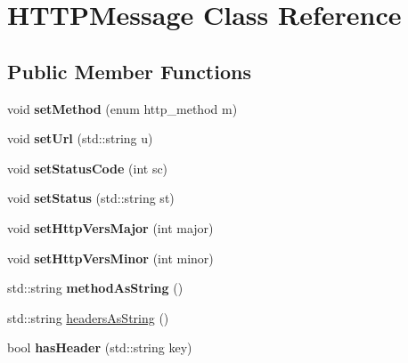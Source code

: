 \hypertarget{class_h_t_t_p_message}{}\section{H\+T\+T\+P\+Message Class Reference}
\label{class_h_t_t_p_message}
\subsection*{Public Member Functions}
\begin{DoxyCompactItemize}
\item 
\mbox{\label{class_h_t_t_p_message_ae8804eb7182c8c01462df47d5a248cd0}} 
void {\bfseries set\+Method} (enum http\+\_\+method m)
\item 
\mbox{\label{class_h_t_t_p_message_ac515a64b1e95e7bdef0b3608a5adc85a}} 
void {\bfseries set\+Url} (std\+::string u)
\item 
\mbox{\label{class_h_t_t_p_message_a1f470d042302e20cf4aa1fca5ee2e878}} 
void {\bfseries set\+Status\+Code} (int sc)
\item 
\mbox{\label{class_h_t_t_p_message_a1e140a748558131a3b4187f5ab5c94ac}} 
void {\bfseries set\+Status} (std\+::string st)
\item 
\mbox{\label{class_h_t_t_p_message_a1b5625121d89688592a90a144f5c39ad}} 
void {\bfseries set\+Http\+Vers\+Major} (int major)
\item 
\mbox{\label{class_h_t_t_p_message_a33999aa1884e27169e04e83529bd82bb}} 
void {\bfseries set\+Http\+Vers\+Minor} (int minor)
\item 
\mbox{\label{class_h_t_t_p_message_ac6a780636e29af6fba0eec1b3d91cc46}} 
std\+::string {\bfseries method\+As\+String} ()
\item 
std\+::string \hyperlink{class_h_t_t_p_message_ae34ca512eaaa6ab18b65dd558ec0e860}{headers\+As\+String} ()
\item 
\mbox{\label{class_h_t_t_p_message_a22099d67bf0793173ef289b0a4307865}} 
bool {\bfseries has\+Header} (std\+::string key)

\end{DoxyCompactItemize}
